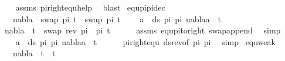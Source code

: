 \begin{isabellebody}
%
\isadelimproof
\ \ %
\endisadelimproof
%
\isatagproof
{}\isamarkupfalse%
\ assms\ pi{\isacharunderscore}{\kern0pt}right{\isacharunderscore}{\kern0pt}equ{\isacharunderscore}{\kern0pt}help\ \isamarkupfalse%
\ blast%
\endisatagproof
{\isafoldproof}%
%
\isadelimproof
\isanewline
%
\endisadelimproof
\isanewline
{}\isamarkupfalse%
\ equ{\isacharunderscore}{\kern0pt}pi{}{\isacharunderscore}{\kern0pt}pi{}{\isacharunderscore}{\kern0pt}dec{\isacharcolon}{\kern0pt}\ \ \isanewline
\ \ \ {\isachardoublequoteopen}nabla\ {\isasymturnstile}\ swap\ pi{}\ t\ {\isasymapprox}\ swap\ pi{}\ t{\isachardoublequoteclose}\isanewline
\ \ \ {\isachardoublequoteopen}{\isasymforall}\ a\ {\isasymin}\ ds\ pi{}\ pi{}{\isachardot}{\kern0pt}\ nabla{\isasymturnstile}a\ {\isasymsharp}\ t{\isachardoublequoteclose}\isanewline
%
\isadelimproof
%
\endisadelimproof
%
\isatagproof
{}\isamarkupfalse%
{\isacharminus}{\kern0pt}\isanewline
\ \ \isamarkupfalse%
\ {\isachardoublequoteopen}nabla\ {\isasymturnstile}\ t\ {\isasymapprox}\ swap\ {\isacharparenleft}{\kern0pt}{\isacharparenleft}{\kern0pt}rev\ pi{}{\isacharparenright}{\kern0pt}\ {\isacharat}{\kern0pt}\ pi{}{\isacharparenright}{\kern0pt}\ t{\isachardoublequoteclose}\isanewline
\ \ \ \ \isamarkupfalse%
\ assms\ equ{\isacharunderscore}{\kern0pt}pi{\isacharunderscore}{\kern0pt}to{\isacharunderscore}{\kern0pt}right\ swap{\isacharunderscore}{\kern0pt}append\ \isamarkupfalse%
\ simp\isanewline
\ \ \isamarkupfalse%
\ \isamarkupfalse%
\ {\isachardoublequoteopen}{\isasymforall}\ a\ {\isasymin}\ ds\ pi{}\ pi{}{\isachardot}{\kern0pt}\ nabla{\isasymturnstile}a\ {\isasymsharp}\ t{\isachardoublequoteclose}\isanewline
\ \ \ \ \isamarkupfalse%
\ pi{\isacharunderscore}{\kern0pt}right{\isacharunderscore}{\kern0pt}equ\ ds{\isacharunderscore}{\kern0pt}rev{\isacharbrackleft}{\kern0pt}of\ pi{}\ pi{}{\isacharbrackright}{\kern0pt}\ \isamarkupfalse%
\ simp\isanewline
{}\isamarkupfalse%
%
\endisatagproof
{\isafoldproof}%
%
\isadelimproof
\isanewline
%
\endisadelimproof
\isanewline
{}\isamarkupfalse%
\ equ{\isacharunderscore}{\kern0pt}weak{\isacharcolon}{\kern0pt}\ \isanewline
\ \ \ {\isachardoublequoteopen}nabla{}\ {\isasymturnstile}\ t{}\ {\isasymapprox}\ t{}{\isachardoublequoteclose}\isanewline

\end{isabellebody}
